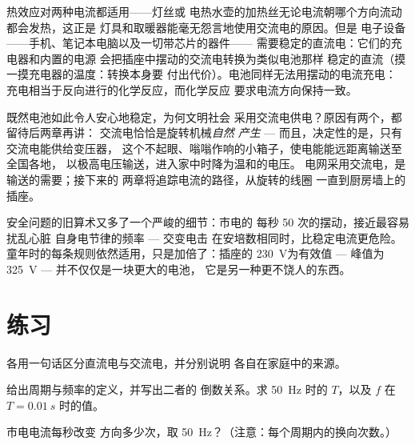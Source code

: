 \begin{example}[哪些器件在意电流方向]\label{ex:g9:alternating-current:whocares}
热效应对两种电流都适用——灯丝或
电热水壶的加热丝无论电流朝哪个方向流动都会发热，这正是
灯具和取暖器能毫无怨言地使用交流电的原因。但是
电子设备——手机、笔记本电脑以及一切带芯片的器件——
需要稳定的直流电：它们的充电器和内置的电源
会把插座中摆动的交流电转换为类似电池那样
稳定的直流（摸一摸充电器的温度：转换本身要
付出代价）。电池同样无法用摆动的电流充电：
充电相当于反向进行的化学反应，而化学反应
要求电流方向保持一致。
\end{example}

\begin{remark}[为什么世界选择了摆动的电流]\label{rem:g9:alternating-current:why}
既然电池如此令人安心地稳定，为何文明社会
采用交流电供电？原因有两个，都留待后两章再讲：
交流电恰恰是旋转机械\emph{自然
产生} --- 而且，决定性的是，只有交流电能供给变压器，
这个不起眼、嗡嗡作响的小箱子，使电能能远距离输送至全国各地，
以极高电压输送，进入家中时降为温和的电压。
电网采用交流电，是输送的需要；接下来的
两章将追踪电流的路径，从旋转的线圈
一直到厨房墙上的插座。
\end{remark}

\begin{remark}[摆动的电流与人体]\label{rem:g9:alternating-current:safety}
安全问题的旧算术又多了一个严峻的细节：市电的
每秒 50 次的摆动，接近最容易扰乱心脏
自身电节律的频率 --- 交变电击
在安培数相同时，比稳定电流更危险。
童年时的每条规则依然适用，只是加倍了：插座的
\qty{230}{V}为有效值 --- 峰值为\qty{325}{V} ---
并不仅仅是一块更大的电池，
它是另一种更不饶人的东西。
\end{remark}

\section{练习}

\begin{exercise}[$\star$]\label{exo:g9:alternating-current:1}
各用一句话区分直流电与交流电，并分别说明
各自在家庭中的来源。
\end{exercise}

\begin{exercise}[$\star$]\label{exo:g9:alternating-current:2}
给出周期与频率的定义，并写出二者的
倒数关系。求 \qty{50}{Hz} 时的 $T$，以及 $f$ 在
$T = \qty{0.01}{s}$ 时的值。
\end{exercise}

\begin{exercise}[$\star$]\label{exo:g9:alternating-current:3}
市电电流每秒改变
方向多少次，取 \qty{50}{Hz}？（注意：每个周期内的换向次数。）
\end{exercise}

